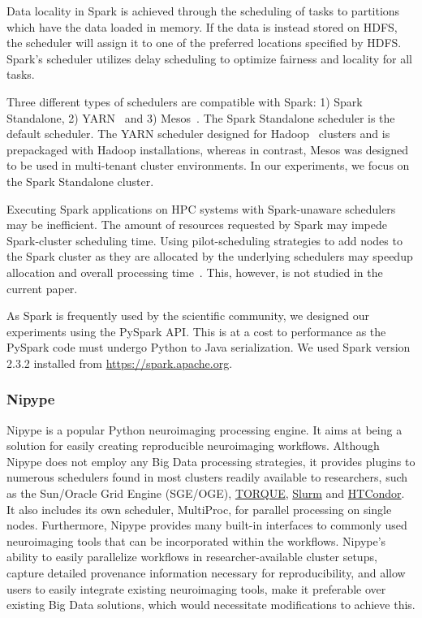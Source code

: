 Data locality in Spark is achieved through the scheduling of tasks to partitions
which have the data loaded in memory. If the data is instead stored on HDFS, the
scheduler will assign it to one of the preferred locations specified by HDFS.
Spark's scheduler utilizes delay scheduling to optimize fairness and locality
for all tasks.

Three different types of schedulers are compatible with Spark: 1) Spark
Standalone, 2) YARN~\cite{vavilapalli2013apache} and 3)
Mesos~\cite{hindman2011mesos}. The Spark Standalone scheduler is the default
scheduler. The YARN scheduler designed for Hadoop~\cite{white2012hadoop}
clusters and is prepackaged with Hadoop installations, whereas in contrast,
Mesos was designed to be used in multi-tenant cluster environments. In our
experiments, we focus on the Spark Standalone cluster.

Executing Spark applications on HPC systems with Spark-unaware schedulers may be
inefficient. The amount of resources requested by Spark may impede Spark-cluster
scheduling time. Using pilot-scheduling strategies to add nodes to the Spark
cluster as they are allocated by the underlying schedulers may speedup
allocation and overall processing time~\cite{paraskevakos2018pilot}. This,
however, is not studied in the current paper.

As Spark is frequently used by the scientific community, we designed our
experiments using the PySpark API. This is at a cost to performance as the
PySpark code must undergo Python to Java serialization. We used Spark version
2.3.2 installed from \url{https://spark.apache.org}.

\subsubsection{Nipype}

Nipype is a popular Python neuroimaging processing engine. It aims at being a
solution for easily creating reproducible neuroimaging workflows. Although
Nipype does not employ any Big Data processing strategies, it provides plugins
to numerous schedulers found in most clusters readily available to researchers,
such as the Sun/Oracle Grid Engine (SGE/OGE),
\href{http://www.adaptivecomputing.com/products/torque/}{TORQUE},
\href{https://slurm.schedmd.com/}{Slurm} and
\href{https://research.cs.wisc.edu/htcondor/}{HTCondor}. It also includes its
own scheduler, MultiProc, for parallel processing on single nodes. Furthermore,
Nipype provides many built-in interfaces to commonly used neuroimaging tools
that can be incorporated within the workflows. Nipype's ability to easily
parallelize workflows in researcher-available cluster setups, capture detailed
provenance information necessary for reproducibility, and allow users to easily
integrate existing neuroimaging tools, make it preferable over existing Big Data
solutions, which would necessitate modifications to achieve this.

